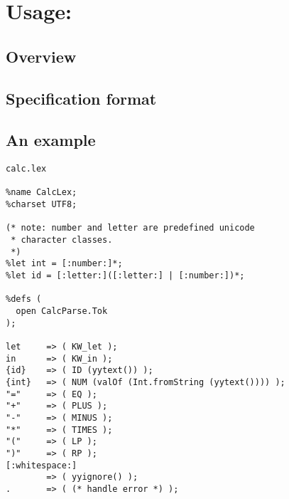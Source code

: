 \chapter[\ulex]{Usage: \ulex}

\section{Overview}

\section{Specification format}



\section{An example}

\begin{verbatim}
calc.lex

%name CalcLex;
%charset UTF8;

(* note: number and letter are predefined unicode 
 * character classes.
 *)
%let int = [:number:]*;
%let id = [:letter:]([:letter:] | [:number:])*;

%defs (
  open CalcParse.Tok
);

let     => ( KW_let );
in      => ( KW_in );
{id}    => ( ID (yytext()) );
{int}   => ( NUM (valOf (Int.fromString (yytext()))) );
"="     => ( EQ );
"+"     => ( PLUS );
"-"     => ( MINUS );
"*"     => ( TIMES );
"("     => ( LP );
")"     => ( RP );
[:whitespace:]
        => ( yyignore() );
.       => ( (* handle error *) );
\end{verbatim}
